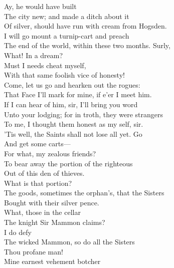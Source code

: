 \documentclass[a4paper,oneside,12pt]{memoir}
\begin{document}
\begin{drama*}
\facespeaks {} Ay, he would have built\\
The city new; and made a ditch about it\\
Of silver, should have run with cream from Hogsden.\\
\mammonspeaks I will go mount a turnip-cart and preach\\
The end of the world, within these two months. Surly,\\
What! In a dream?\\
\surlyspeaks {} Must I needs cheat myself,\\
With that same foolish vice of honesty!\\
Come, let us go and hearken out the rogues:\\
That Face I'll mark for mine, if e'er I meet him.\\
\facespeaks If I can hear of him, sir, I'll bring you word\\
Unto your lodging; for in troth, they were strangers\\
To me, I thought them honest as my self, sir.\\
\tribulationspeaks 'Tis well, the Saints shall not lose all yet. Go\\
And get some carts---\\
\lovewitspeaks {} For what, my zealous friends?\\
\persecutionspeaks To bear away the portion of the righteous\\
Out of this den of thieves.\\
\lovewitspeaks {} What is that portion?\\
\persecutionspeaks The goods, sometimes the orphan's, that the Sisters\\
Bought with their silver pence.\\
\lovewitspeaks {} What, those in the cellar\\
The knight Sir Mammon claims?\\
\persecutionspeaks {} I do defy\\
The wicked Mammon, so do all the Sisters\\
Thou profane man!\\
\lovewitspeaks {} Mine earnest vehement botcher\\

\end{drama*}
\end{document}
